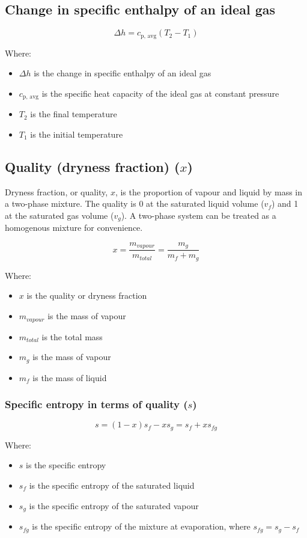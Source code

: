 \documentclass[11pt]{article}
\begin{document}
\subsection{Change in specific enthalpy of an ideal gas}
\label{sec:org1900c4e}
\[\Delta h = c_{\text{p, avg}} (T_2 - T_1)\]

Where:
\begin{itemize}
\item \(\Delta h\) is the change in specific enthalpy of an ideal gas
\item \(c_{\text{p, avg}}\) is the specific heat capacity of the ideal gas at constant pressure
\item \(T_2\) is the final temperature
\item \(T_1\) is the initial temperature
\end{itemize}
\subsection{Quality (dryness fraction) (\(x\))}
\label{sec:orgc53c438}
Dryness fraction, or quality, \(x\), is the proportion of vapour and liquid by mass in a two-phase mixture. The quality is 0 at the saturated liquid volume (\(v_f\)) and 1 at the saturated gas volume (\(v_g\)). A two-phase system can be treated as a homogenous mixture for convenience.

\[x = \frac{m_{vapour}}{m_{total}} = \frac{m_g}{m_f + m_g}\]

Where:
\begin{itemize}
\item \(x\) is the quality or dryness fraction
\item \(m_{vapour}\) is the mass of vapour
\item \(m_{total}\) is the total mass
\item \(m_g\) is the mass of vapour
\item \(m_f\) is the mass of liquid
\end{itemize}
\subsubsection{Specific entropy in terms of quality (\(s\))}
\label{sec:org6ff319d}
\[s = (1 - x)s_f - xs_g = s_f + xs_{fg}\]

Where:
\begin{itemize}
\item \(s\) is the specific entropy
\item \(s_f\) is the specific entropy of the saturated liquid
\item \(s_g\) is the specific entropy of the saturated vapour
\item \(s_{fg}\) is the specific entropy of the mixture at evaporation, where \(s_{fg} = s_g - s_f\)
\end{itemize}
\end{document}

